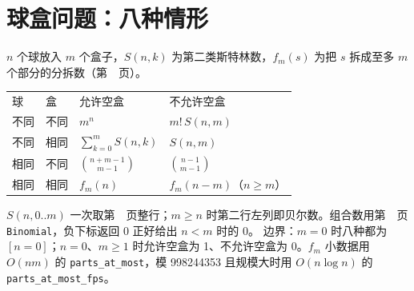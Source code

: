 \label{end-combinatorics-supplement}

\section{球盒问题：八种情形}\label{knowledge-ball-box}
$n$ 个球放入 $m$ 个盒子，$S(n,k)$ 为第二类斯特林数，$f_m(s)$ 为把 $s$ 拆成至多 $m$ 个部分的分拆数（第~\pageref{compact-parts_at_most}~页）。
\begin{center}
\begin{tabular}{llll}
球 & 盒 & 允许空盒 & 不允许空盒\\
不同 & 不同 & $m^n$ & $m!\,S(n,m)$\\
不同 & 相同 & $\sum_{k=0}^{m}S(n,k)$ & $S(n,m)$\\
相同 & 不同 & $\binom{n+m-1}{m-1}$ & $\binom{n-1}{m-1}$\\
相同 & 相同 & $f_m(n)$ & $f_m(n-m)$（$n\ge m$）\\
\end{tabular}
\end{center}
$S(n,0..m)$ 一次取第~\pageref{compact-stirling_second_row}~页整行；$m\ge n$ 时第二行左列即贝尔数。组合数用第~\pageref{compact-Binomial}~页 \texttt{Binomial}，负下标返回 0 正好给出 $n<m$ 时的 0。
边界：$m=0$ 时八种都为 $[n=0]$；$n=0$、$m\ge1$ 时允许空盒为 1、不允许空盒为 0。$f_m$ 小数据用 $O(nm)$ 的 \texttt{parts\_at\_most}，模 998244353 且规模大时用 $O(n\log n)$ 的 \texttt{parts\_at\_most\_fps}。
